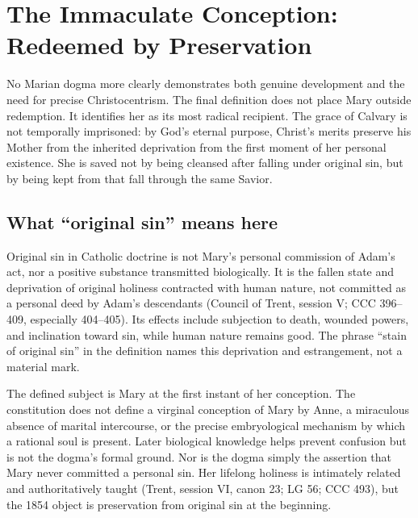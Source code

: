 \section{The Immaculate Conception: Redeemed by Preservation}


No Marian dogma more clearly demonstrates both genuine development and the need for precise Christocentrism. The final definition does not place Mary outside redemption. It identifies her as its most radical recipient. The grace of Calvary is not temporally imprisoned: by God's eternal purpose, Christ's merits preserve his Mother from the inherited deprivation from the first moment of her personal existence. She is saved not by being cleansed after falling under original sin, but by being kept from that fall through the same Savior.

\subsection{What ``original sin'' means here}

Original sin in Catholic doctrine is not Mary's personal commission of Adam's act, nor a positive substance transmitted biologically. It is the fallen state and deprivation of original holiness contracted with human nature, not committed as a personal deed by Adam's descendants (Council of Trent, session V; CCC 396--409, especially 404--405). Its effects include subjection to death, wounded powers, and inclination toward sin, while human nature remains good. The phrase ``stain of original sin'' in the definition names this deprivation and estrangement, not a material mark.

The defined subject is Mary at the first instant of her conception. The constitution does not define a virginal conception of Mary by Anne, a miraculous absence of marital intercourse, or the precise embryological mechanism by which a rational soul is present. Later biological knowledge helps prevent confusion but is not the dogma's formal ground. Nor is the dogma simply the assertion that Mary never committed a personal sin. Her lifelong holiness is intimately related and authoritatively taught (Trent, session VI, canon 23; LG 56; CCC 493), but the 1854 object is preservation from original sin at the beginning.

